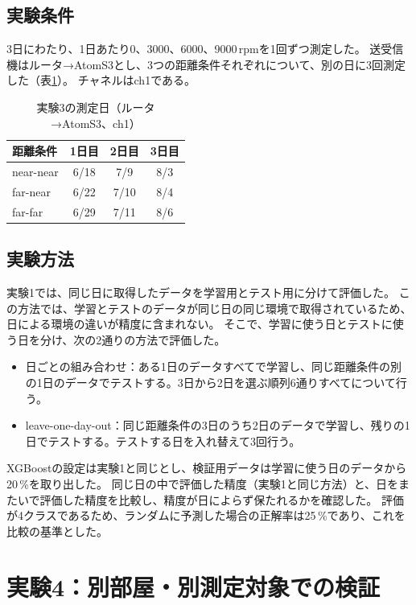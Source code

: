 \documentclass[uplatex, 12pt]{ujbook}
\begin{document}
\section{実験条件}
3日にわたり、1日あたり0、3000、6000、9000\,rpmを1回ずつ測定した。
送受信機はルータ→AtomS3とし、3つの距離条件それぞれについて、別の日に3回測定した（表\ref{tab:exp3}）。
チャネルはch1である。
\begin{table}[htbp]
  \centering
  \caption{実験3の測定日（ルータ→AtomS3、ch1）}
  \label{tab:exp3}
  \begin{tabular}{l c c c}
    \toprule
    距離条件 & 1日目 & 2日目 & 3日目 \\
    \midrule
    near-near & 6/18 & 7/9 & 8/3 \\
    far-near  & 6/22 & 7/10 & 8/4 \\
    far-far   & 6/29 & 7/11 & 8/6 \\
    \bottomrule
  \end{tabular}
\end{table}

\section{実験方法}
実験1では、同じ日に取得したデータを学習用とテスト用に分けて評価した。
この方法では、学習とテストのデータが同じ日の同じ環境で取得されているため、日による環境の違いが精度に含まれない。
そこで、学習に使う日とテストに使う日を分け、次の2通りの方法で評価した。
\begin{itemize}
  \item 日ごとの組み合わせ：ある1日のデータすべてで学習し、同じ距離条件の別の1日のデータでテストする。3日から2日を選ぶ順列6通りすべてについて行う。
  \item leave-one-day-out：同じ距離条件の3日のうち2日のデータで学習し、残りの1日でテストする。テストする日を入れ替えて3回行う。
\end{itemize}
XGBoostの設定は実験1と同じとし、検証用データは学習に使う日のデータから20\,\%を取り出した。
同じ日の中で評価した精度（実験1と同じ方法）と、日をまたいで評価した精度を比較し、精度が日によらず保たれるかを確認した。
評価が4クラスであるため、ランダムに予測した場合の正解率は25\,\%であり、これを比較の基準とした。

\chapter{実験4：別部屋・別測定対象での検証}
\end{document}
